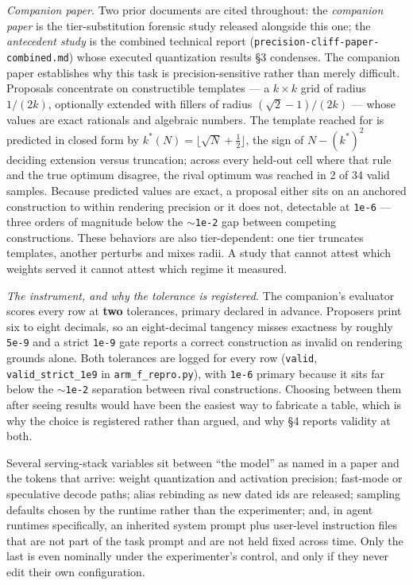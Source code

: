\emph{Companion paper.} Two prior documents are cited throughout: the \emph{companion paper} is the tier-substitution forensic study released alongside this one; the \emph{antecedent study} is the combined technical report (\texttt{precision-cliff-paper-combined.md}) whose executed quantization results \S3 condenses. The companion paper establishes why this task is precision-sensitive rather than merely difficult. Proposals concentrate on constructible templates --- a $k \times k$ grid of radius $1/(2k)$, optionally extended with fillers of radius $(\sqrt{2} - 1)/(2k)$ --- whose values are exact rationals and algebraic numbers. The template reached for is predicted in closed form by $k^*(N) = \lfloor \sqrt{N} + \tfrac{1}{2} \rfloor$, the sign of $N - (k^*)^2$ deciding extension versus truncation; across every held-out cell where that rule and the true optimum disagree, the rival optimum was reached in 2 of 34 valid samples. Because predicted values are exact, a proposal either sits on an anchored construction to within rendering precision or it does not, detectable at \texttt{1e-6} --- three orders of magnitude below the $\sim$\texttt{1e-2} gap between competing constructions. These behaviors are also tier-dependent: one tier truncates templates, another perturbs and mixes radii. A study that cannot attest which weights served it cannot attest which regime it measured.

\emph{The instrument, and why the tolerance is registered.} The companion's evaluator scores every row at \textbf{two} tolerances, primary declared in advance. Proposers print six to eight decimals, so an eight-decimal tangency misses exactness by roughly \texttt{5e-9} and a strict \texttt{1e-9} gate reports a correct construction as invalid on rendering grounds alone. Both tolerances are logged for every row (\texttt{valid}, \texttt{valid\_strict\_1e9} in \texttt{arm\_f\_repro.py}), with \texttt{1e-6} primary because it sits far below the $\sim$\texttt{1e-2} separation between rival constructions. Choosing between them after seeing results would have been the easiest way to fabricate a table, which is why the choice is registered rather than argued, and why \S4 reports validity at both.

Several serving-stack variables sit between ``the model'' as named in a paper and the tokens that arrive: weight quantization and activation precision; fast-mode or speculative decode paths; alias rebinding as new dated ids are released; sampling defaults chosen by the runtime rather than the experimenter; and, in agent runtimes specifically, an inherited system prompt plus user-level instruction files that are not part of the task prompt and are not held fixed across time. Only the last is even nominally under the experimenter's control, and only if they never edit their own configuration.

